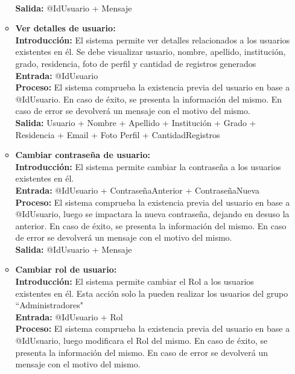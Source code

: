 \begin{enumerate}[A.]
\begin{itemize}
            \\ \textbf{Salida:} @IdUsuario + Mensaje
            \\
          \item \textbf{Ver detalles de usuario:}
            \\ \textbf{Introducción:} El sistema permite ver detalles relacionados a los usuarios existentes en él. Se debe visualizar usuario, nombre, apellido, institución, grado, residencia, foto de perfil y cantidad de registros generados
            \\ \textbf{Entrada:} @IdUsuario
            \\ \textbf{Proceso:} El sistema comprueba la existencia previa del usuario en base a @IdUsuario. En caso de éxito, se presenta la información del mismo. En caso de error se devolverá un mensaje con el motivo del mismo.
            \\ \textbf{Salida:} Usuario + Nombre + Apellido + Institución + Grado + Residencia + Email + Foto Perfil + CantidadRegistros
            \\
          \item \textbf{Cambiar contraseña de usuario:}
            \\ \textbf{Introducción:} El sistema permite cambiar la contraseña a los usuarios existentes en él.
            \\ \textbf{Entrada:} @IdUsuario + ContraseñaAnterior + ContraseñaNueva
            \\ \textbf{Proceso:} El sistema comprueba la existencia previa del usuario en base a @IdUsuario, luego se impactara la nueva contraseña, dejando en desuso la anterior. En caso de éxito, se presenta la información del mismo. En caso de error se devolverá un mensaje con el motivo del mismo.
            \\ \textbf{Salida:} @IdUsuario + Mensaje
            \\
          \item \textbf{Cambiar rol de usuario:}
            \\ \textbf{Introducción:} El sistema permite cambiar el Rol a los usuarios existentes en él. Esta acción solo la pueden realizar los usuarios del grupo ``Administradores"
            \\ \textbf{Entrada:} @IdUsuario + Rol
            \\ \textbf{Proceso:} El sistema comprueba la existencia previa del usuario en base a @IdUsuario, luego modificara el Rol del mismo. En caso de éxito, se presenta la información del mismo. En caso de error se devolverá un mensaje con el motivo del mismo.

\end{itemize}
\end{enumerate}
